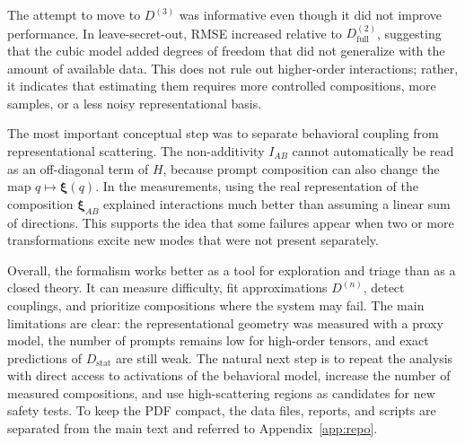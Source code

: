 \documentclass[10pt,twocolumn]{article}
\newcommand{\Dstat}{D_{\mathrm{stat}}}
\newcommand{\xrep}{\bm{\xi}}
\begin{document}
The attempt to move to \(D^{(3)}\) was informative even though it did not improve performance. In leave-secret-out, RMSE increased relative to \(D^{(2)}_{\mathrm{full}}\), suggesting that the cubic model added degrees of freedom that did not generalize with the amount of available data. This does not rule out higher-order interactions; rather, it indicates that estimating them requires more controlled compositions, more samples, or a less noisy representational basis.

The most important conceptual step was to separate behavioral coupling from representational scattering. The non-additivity \(I_{AB}\) cannot automatically be read as an off-diagonal term of \(H\), because prompt composition can also change the map \(q\mapsto\xrep(q)\). In the measurements, using the real representation of the composition \(\xrep_{AB}\) explained interactions much better than assuming a linear sum of directions. This supports the idea that some failures appear when two or more transformations excite new modes that were not present separately.

Overall, the formalism works better as a tool for exploration and triage than as a closed theory. It can measure difficulty, fit approximations \(D^{(n)}\), detect couplings, and prioritize compositions where the system may fail. The main limitations are clear: the representational geometry was measured with a proxy model, the number of prompts remains low for high-order tensors, and exact predictions of \(\Dstat\) are still weak. The natural next step is to repeat the analysis with direct access to activations of the behavioral model, increase the number of measured compositions, and use high-scattering regions as candidates for new safety tests. To keep the PDF compact, the data files, reports, and scripts are separated from the main text and referred to Appendix~\ref{app:repo}.
\end{document}
